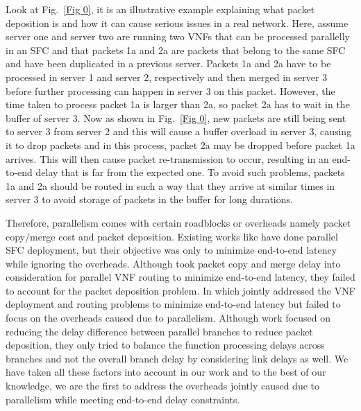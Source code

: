 \documentclass[journal]{IEEEtran}
\begin{document}
Look at Fig.~\ref{Fig 0}, it is an illustrative example explaining what packet deposition is and how it can cause serious issues in a real network. Here, assume server one and server two are running two VNFs that can be processed parallelly in an SFC and that packets 1a and 2a are packets that belong to the same SFC and have been duplicated in a previous server. Packets 1a and 2a have to be processed in server 1 and server 2, respectively and then merged in server 3 before further processing can happen in server 3 on this packet. However, the time taken to process packet 1a is larger than 2a, so packet 2a has to wait in the buffer of server 3. Now as shown in Fig.~\ref{Fig 0}, new packets are still being sent to server 3 from server 2 and this will cause a buffer overload in server 3, causing it to drop packets and in this process, packet 2a may be dropped before packet 1a arrives. This will then cause packet re-transmission to occur, resulting in an end-to-end delay that is far from the expected one. To avoid such problems, packets 1a and 2a should be routed in such a way that they arrive at similar times in server 3 to avoid storage of packets in the buffer for long durations.

Therefore, parallelism comes with certain roadblocks or overheads namely packet copy/merge cost and packet deposition. Existing works like \cite{TWC} have done parallel SFC deployment, but their objective was only to minimize end-to-end latency while ignoring the overheads. Although \cite{TON} took packet copy and merge delay into consideration for parallel VNF routing to minimize end-to-end latency, they failed to account for the packet deposition problem. In \cite{TON-extension} which jointly addressed the VNF deployment and routing problems to minimize end-to-end latency but failed to focus on the overheads caused due to parallelism. Although work \cite{appm} focused on reducing the delay difference between parallel branches to reduce packet deposition, they only tried to balance the function processing delays across branches and not the overall branch delay by considering link delays as well. We have taken all these factors into account in our work and to the best of our knowledge, we are the first to address the overheads jointly caused due to parallelism while meeting end-to-end delay constraints.
\end{document}
